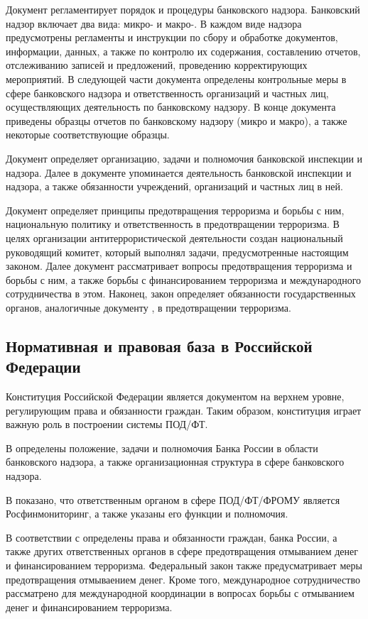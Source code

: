\documentclass{article}
\begin{document}
Документ \cite{tt0822} регламентирует порядок и процедуры банковского надзора. Банковский надзор включает два вида: микро- и макро-. В каждом виде надзора предусмотрены регламенты и инструкции по сбору и обработке документов, информации, данных, а также по контролю их содержания, составлению отчетов, отслеживанию записей и предложений, проведению корректирующих мероприятий. В следующей части документа определены контрольные меры в сфере банковского надзора и ответственность организаций и частных лиц, осуществляющих деятельность по банковскому надзору. В конце документа приведены образцы отчетов по банковскому надзору (микро и макро), а также некоторые соответствующие образцы.

Документ \cite{ndcp2614} определяет организацию, задачи и полномочия банковской инспекции и надзора. Далее в документе упоминается деятельность банковской инспекции и надзора, а также обязанности учреждений, организаций и частных лиц в ней.

Документ \cite{law28} определяет принципы предотвращения терроризма и борьбы с ним, национальную политику и ответственность в предотвращении терроризма. В целях организации антитеррористической деятельности создан национальный руководящий комитет, который выполнял задачи, предусмотренные настоящим законом. Далее документ рассматривает вопросы предотвращения терроризма и борьбы с ним, а также борьбы с финансированием терроризма и международного сотрудничества в этом. Наконец, закон определяет обязанности государственных органов, аналогичные документу \cite{law14}, в предотвращении терроризма.

\hfill

\subsection{Нормативная и правовая база в Российской Федерации}

Конституция Российской Федерации является документом на верхнем уровне, регулирующим права и обязанности граждан. Таким образом, конституция играет важную роль в построении системы ПОД/ФТ.

В \cite{fz86} определены положение, задачи и полномочия Банка России в области банковского надзора, а также организационная структура в сфере банковского надзора.

В \cite{pre808} показано, что ответственным органом в сфере ПОД/ФТ/ФРОМУ является Росфинмониторинг, а также указаны его функции и полномочия.

В соответствии с \cite{fz115} определены права и обязанности граждан, банка России, а также других ответственных органов в сфере предотвращения отмыванием денег и финансированием терроризма. Федеральный закон также предусматривает меры предотвращения отмываением денег. Кроме того, международное сотрудничество рассматрено для международной координации в вопросах борьбы с отмыванием денег и финансированием терроризма.
\end{document}
